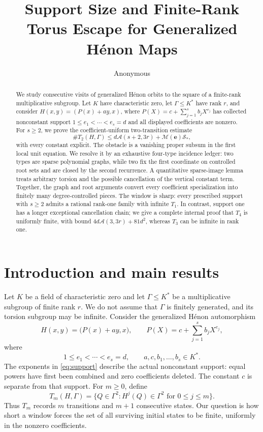 \documentclass[11pt]{article}
\title{Support Size and Finite-Rank Torus Escape for Generalized Hénon Maps}
\author{Anonymous}
\date{}
\theoremstyle{definition}
\begin{document}
\maketitle

\begin{abstract}
We study consecutive visits of generalized Hénon orbits to the square of a finite-rank multiplicative subgroup. Let \(K\) have characteristic zero, let \(\Gamma\leq K^*\) have rank \(r\), and consider \(H(x,y)=(P(x)+ay,x)\), where \(P(X)=c+\sum_{j=1}^{s}b_jX^{e_j}\) has collected nonconstant support \(1\leq e_1<\cdots<e_s=d\) and all displayed coefficients are nonzero. For \(s\geq2\), we prove the coefficient-uniform two-transition estimate
\[
 \#T_2(H,\Gamma)\leq d\mathcal A(s+2,3r)+\mathcal M(\mathbf e)\mathcal S_*,
\]
with every constant explicit. The obstacle is a vanishing proper subsum in the first local unit equation. We resolve it by an exhaustive four-type incidence ledger: two types are sparse polynomial graphs, while two fix the first coordinate on controlled root sets and are closed by the second recurrence. A quantitative sparse-image lemma treats arbitrary torsion and the possible cancellation of the vertical constant term. Together, the graph and root arguments convert every coefficient specialization into finitely many degree-controlled pieces. The window is sharp: every prescribed support with \(s\geq2\) admits a rational rank-one family with infinite \(T_1\). In contrast, support one has a longer exceptional cancellation chain; we give a complete internal proof that \(T_4\) is uniformly finite, with bound \(4d\mathcal A(3,3r)+81d^2\), whereas \(T_3\) can be infinite in rank one.
\end{abstract}

\section{Introduction and main results}
\label{sec:introduction}

Let \(K\) be a field of characteristic zero and let \(\Gamma\leq K^*\) be a multiplicative subgroup of finite rank \(r\). We do not assume that \(\Gamma\) is finitely generated, and its torsion subgroup may be infinite. Consider the generalized Hénon automorphism
\begin{equation}
 H(x,y)=\bigl(P(x)+ay,x\bigr),
 \qquad
 P(X)=c+\sum_{j=1}^{s}b_jX^{e_j},
 \label{eq:map}
\end{equation}
where
\begin{equation}
 1\leq e_1<\cdots<e_s=d,
 \qquad
 a,c,b_1,\ldots,b_s\in K^*.
 \label{eq:support}
\end{equation}
The exponents in \eqref{eq:support} describe the actual nonconstant support: equal powers have first been combined and zero coefficients deleted. The constant \(c\) is separate from that support. For \(m\geq0\), define
\begin{equation}
 T_m(H,\Gamma)=
 \{Q\in\Gamma^2:H^j(Q)\in\Gamma^2\text{ for }0\leq j\leq m\}.
 \label{eq:survivor}
\end{equation}
Thus \(T_m\) records \(m\) transitions and \(m+1\) consecutive states. Our question is how short a window forces the set of all surviving initial states to be finite, uniformly in the nonzero coefficients.
\end{document}
